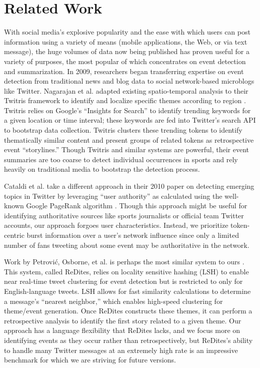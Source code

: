 \documentclass{acm_proc_article-sp}
\begin{document}
\section{Related Work}

{\color{red}
With social media's explosive popularity and the ease with which users can post information using a variety of means (mobile applications, the Web, or via text message), the huge volumes of data now being published has proven useful for a variety of purposes, the most popular of which concentrates on event detection and summarization.
In 2009, researchers began transferring expertise on event detection from traditional news and blog data to social network-based microblogs like Twitter.
Nagarajan et al. adapted existing spatio-temporal analysis to their Twitris framework to identify and localize specific themes according to region \cite{Nagarajan:2009:SAC:1692411.1692481}.
Twitris relies on Google's ``Insights for Search'' to identify trending keywords for a given location or time interval; these keywords are fed into Twitter's search API to bootstrap data collection.
Twitris clusters these trending tokens to identify thematically similar content and present groups of related tokens as retrospective event ``storylines.''
Though Twitris and similar systems \cite{Sankaranarayanan:2009:TNT:1653771.1653781,Long:2011:TEE:2035562.2035636} are powerful, their event summaries are too coarse to detect individual occurrences in sports and rely heavily on traditional media to bootstrap the detection process.

Cataldi et al. take a different approach in their 2010 paper on detecting emerging topics in Twitter by leveraging ``user authority'' as calculated using the well-known Google PageRank algorithm \cite{Cataldi:2010:ETD:1814245.1814249}.
Though this approach might be useful for identifying authoritative sources like sports journalists or official team Twitter accounts, our approach forgoes user characteristics.
Instead, we prioritize token-centric burst information over  a user's network influence since only a limited number of fans tweeting about some event may be authoritative in the network.

Work by Petrovi\'{c}, Osborne, et al. is perhaps the most similar system to ours \cite{Petrovic:2010:SFS:1857999.1858020,petrovic2013can,osborne2014real}.
This system, called ReDites, relies on locality sensitive hashing (LSH) to enable near real-time tweet clustering for event detection but is restricted to only for English-language tweets.
LSH allows for fast similarity calculations to determine a message's ``nearest neighbor,'' which enables high-speed clustering for theme/event generation.
Once ReDites constructs these themes, it can perform a retrospective analysis to identify the first story related to a given theme.
Our approach has a language flexibility that ReDites lacks, and we focus more on identifying events as they occur rather than retrospectively, but ReDites's ability to handle many Twitter messages at an extremely high rate is an impressive benchmark for which we are striving for future versions.

}
\end{document}
